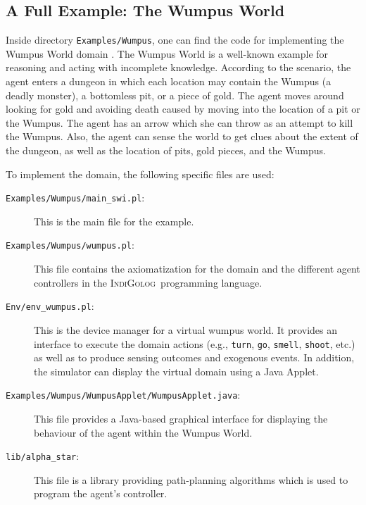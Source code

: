 \documentclass[11pt]{article}
\newcommand{\IndiGolog}{\mbox{\textsc{IndiGolog}}}
\begin{document}
\subsection{A Full Example: The Wumpus World} \label{sec:ex_wumpus}


Inside directory \texttt{Examples/Wumpus}, one can find the code for
implementing the Wumpus World domain \cite[Chapter 7]{RN03}. The Wumpus World is
a well-known example for reasoning and acting with incomplete knowledge.
According to the scenario, the agent enters a dungeon in which each location may
contain the Wumpus (a deadly monster), a bottomless pit, or a piece of gold. The
agent moves around looking for gold and avoiding death caused by moving into the
location of a pit or the Wumpus. The agent has an arrow which she can throw as
an attempt to kill the Wumpus. Also, the agent can sense the world to get clues
about the extent of the dungeon, as well as the location of pits, gold pieces,
and the Wumpus.

To implement the domain, the following specific files are used:
\begin{description}
\item[\texttt{Examples/Wumpus/main\_swi.pl}:] This is the main file for the
example.

\item[\texttt{Examples/Wumpus/wumpus.pl}:] This file contains the axiomatization
for the domain and the different agent controllers in the \IndiGolog\
programming language.

\item[\texttt{Env/env\_wumpus.pl}:] This is the device manager for a virtual
wumpus world. It provides an interface to execute the domain actions (e.g., 
\texttt{turn}, \texttt{go}, \texttt{smell}, \texttt{shoot}, etc.) as well as to
produce sensing outcomes and exogenous events. In addition, the simulator can
display the virtual domain using a Java Applet.

\item[\texttt{Examples/Wumpus/WumpusApplet/WumpusApplet.java}:] This file
provides a Java-based graphical interface for displaying the behaviour of the
agent within the Wumpus World. 

\item[\texttt{lib/alpha\_star}:] This file is a library providing path-planning
algorithms which is used to program the agent's controller.
\end{description}
\end{document}
